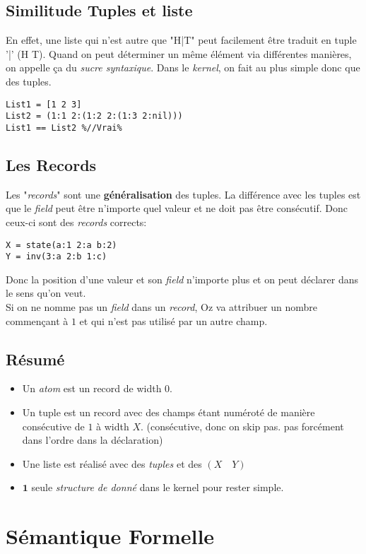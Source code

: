 \documentclass{report}
\begin{document}
\subsection{Similitude Tuples et liste}
En effet, une liste qui n'est autre que "H|T" peut facilement être traduit en tuple '|' (H T). Quand on peut déterminer un même élément via différentes manières, on appelle ça du \textit{sucre syntaxique}. Dans le \textit{kernel}, on fait au plus simple donc que des tuples.
\begin{lstlisting}[escapechar=\%]
List1 = [1 2 3]
List2 = (1:1 2:(1:2 2:(1:3 2:nil)))
List1 == List2 %//Vrai%
\end{lstlisting}

\subsection{Les Records}
Les "\textit{records}" sont une \textbf{généralisation} des tuples. La différence avec les tuples est que le \textit{field} peut être n'importe quel valeur et ne doit pas être consécutif. Donc ceux-ci sont des \textit{records} corrects:
\begin{lstlisting}
X = state(a:1 2:a b:2)
Y = inv(3:a 2:b 1:c)

\end{lstlisting}
Donc la position d'une valeur et son \textit{field} n'importe plus et on peut déclarer dans le sens qu'on veut.\\
Si on ne nomme pas un \textit{field} dans un \textit{record}, Oz va attribuer un nombre commençant à $1$ et qui n'est pas utilisé par un autre champ.\\
\subsection{Résumé}
\begin{itemize}
\item Un \textit{atom} est un record de width $0$.
\item Un tuple est un record avec des champs étant numéroté de manière consécutive de $1$ à width $X$. (consécutive, donc on skip pas. pas forcément dans l'ordre dans la déclaration)
\item Une liste est réalisé avec des \textit{tuples} et des $(X \quad Y)$
\item $\textbf{1}$ seule \textit{structure de donné} dans le kernel pour rester simple.
\end{itemize}

\section{Sémantique Formelle}
\end{document}
